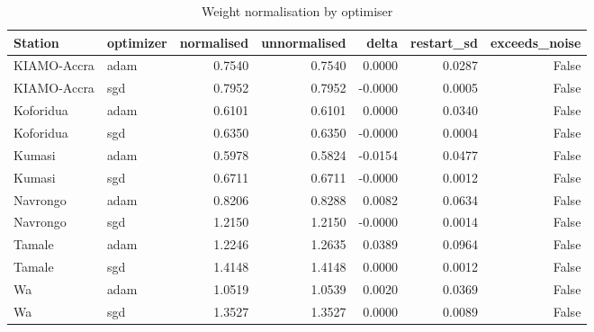 \begin{table}[H]
\centering
\caption{Weight normalisation by optimiser}
\label{tab:normalisation}
\begin{singlespace}
\begin{tabular}{llrrrrr}
\toprule
Station & optimizer & normalised & unnormalised & delta & restart\_sd & exceeds\_noise \\
\midrule
KIAMO-Accra & adam & 0.7540 & 0.7540 & 0.0000 & 0.0287 & False \\
KIAMO-Accra & sgd & 0.7952 & 0.7952 & -0.0000 & 0.0005 & False \\
Koforidua & adam & 0.6101 & 0.6101 & 0.0000 & 0.0340 & False \\
Koforidua & sgd & 0.6350 & 0.6350 & -0.0000 & 0.0004 & False \\
Kumasi & adam & 0.5978 & 0.5824 & -0.0154 & 0.0477 & False \\
Kumasi & sgd & 0.6711 & 0.6711 & -0.0000 & 0.0012 & False \\
Navrongo & adam & 0.8206 & 0.8288 & 0.0082 & 0.0634 & False \\
Navrongo & sgd & 1.2150 & 1.2150 & -0.0000 & 0.0014 & False \\
Tamale & adam & 1.2246 & 1.2635 & 0.0389 & 0.0964 & False \\
Tamale & sgd & 1.4148 & 1.4148 & 0.0000 & 0.0012 & False \\
Wa & adam & 1.0519 & 1.0539 & 0.0020 & 0.0369 & False \\
Wa & sgd & 1.3527 & 1.3527 & 0.0000 & 0.0089 & False \\
\bottomrule
\end{tabular}
\end{singlespace}
\end{table}
